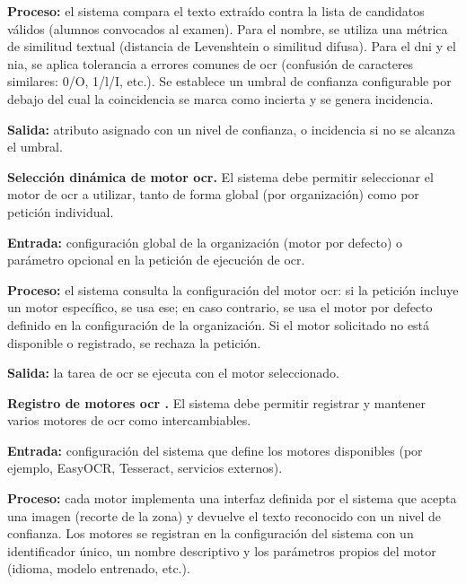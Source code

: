 \begin{functional}
    \textbf{Proceso:} el sistema compara el texto extraído contra la lista de candidatos
    válidos (alumnos convocados al examen). Para el nombre, se utiliza una métrica de
    similitud textual (distancia de Levenshtein o similitud difusa). Para el \acs{dni} y el
    \acs{nia}, se aplica tolerancia a errores comunes de \acs{ocr} (confusión de caracteres
    similares: 0/O, 1/l/I, etc.). Se establece un umbral de confianza configurable por
    debajo del cual la coincidencia se marca como incierta y se genera incidencia.

    \textbf{Salida:} atributo asignado con un nivel de confianza, o incidencia si no se
    alcanza el umbral.

    \item \textbf{Selección dinámica de motor \acs{ocr}.}
    \label{rf:ingestion:ocr_select}
    El sistema debe permitir seleccionar el motor de \acs{ocr} a utilizar, tanto de forma
    global (por organización) como por petición individual.

    \textbf{Entrada:} configuración global de la organización (motor por defecto) o
    parámetro opcional en la petición de ejecución de \acs{ocr}.

    \textbf{Proceso:} el sistema consulta la configuración del motor \acs{ocr}: si la
    petición incluye un motor específico, se usa ese; en caso contrario, se usa el motor por
    defecto definido en la configuración de la organización. Si el motor solicitado no está
    disponible o registrado, se rechaza la petición.

    \textbf{Salida:} la tarea de \acs{ocr} se ejecuta con el motor seleccionado.

    \item \textbf{Registro de motores \acs{ocr} .}
    \label{rf:ingestion:ocr_registry}
    El sistema debe permitir registrar y mantener varios motores de \acs{ocr} como
     intercambiables.

    \textbf{Entrada:} configuración del sistema que define los motores disponibles (por
    ejemplo, EasyOCR, Tesseract, servicios externos).

    \textbf{Proceso:} cada motor implementa una interfaz definida por el sistema que acepta
    una imagen (recorte de la zona) y devuelve el texto reconocido con un nivel de
    confianza. Los motores se registran en la configuración del sistema con un identificador
    único, un nombre descriptivo y los parámetros propios del motor (idioma, modelo
    entrenado, etc.).


\end{functional}
